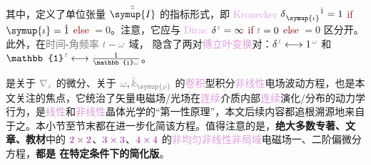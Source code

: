 其中，定义了单位张量 $\bar{\bar{\symup{I}}}$ 的指标形式，即 \textcolor{Plum}{Kronecker} $\delta^{\;\! \hphantom{\symup{\iota}} \hat{1}}_{\;\! \symup{\iota} \hphantom{z}} = 1$ \textcolor{Maroon}{if} $\symup{\iota} = \hat{1}$ \textcolor{Maroon}{else} $= 0$。注意，它应与 \textcolor{Plum}{Dirac} $\delta^{\;\! \mathcolor{gray}{t}} = \infty$ \textcolor{Maroon}{if} $\mathcolor{gray}{t} = 0$ \textcolor{Maroon}{else} $= 0$ 区分开。此外，在\textcolor{gray}{时间}-\textcolor{gray}{角频率} $\mathcolor{gray}{t} - \mathcolor{gray}{\omega}$ 域， 隐含了两对\textcolor{Plum}{傅立叶变换}对：$\delta^{\;\! \mathcolor{gray}{t}} \longleftrightarrow 1^{\;\! \mathcolor{gray}{\omega}}$ 和 $\mathbb{1}^{\;\! \mathcolor{gray}{t}} \longleftrightarrow \frac{1}{\mathbb{i} \mathcolor{gray}{\omega}}$。

 是关于 $\mathcolor{gray}{\nabla_z}$ 的微分、关于 $\mathcolor{gray}{\omega}, \mathcolor{gray}{\bar{k}_{\symup{\rho}}}$ 的\textcolor{Plum}{卷积}型积分\textcolor{Plum}{非线性}电场波动方程，也是本文关注的焦点，它统治了矢量电磁场/光场在\textcolor{Plum}{连续}介质内部\textcolor{Plum}{连续}演化/分布的动力学行为，是\textcolor{Plum}{线性}和\textcolor{Plum}{非线性}\textcolor{PineGreen}{晶体光学}的“\textcolor{NavyBlue}{第一性原理}”，本文后续内容都追根溯源地来自于之。本小节至节末都在进一步化简该方程。值得注意的是，\textbf{绝大多数专著、文章、教材}中的 $\textcolor{Plum}{2 \times 2}$、$\textcolor{Plum}{3 \times 3}$、$\textcolor{Plum}{4 \times 4}$ 的\textcolor{Plum}{非均匀}\textcolor{Plum}{非线性}\textcolor{Plum}{非局域}电磁场一、二阶偏微分方程\cite{zhangRigorousModelingLaser2015,zhangFullyVectorialSimulation2016,stallingaBerreman4x4Matrix1999,borzdovWavesLinearQuadratic1996,changWavePropagationBianisotropic2014,sturmElectromagneticWavesCrystals2024,sturmElectromagneticWavesCrystals2024,mcleodVectorFourierOptics2014,berryOpticalSingularitiesBianisotropic2005,raabMultipoleTheoryElectromagnetism2004}，\textbf{都是  在特定条件下的简化版}。%

